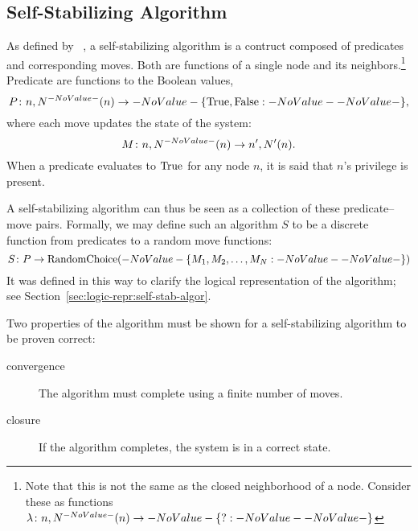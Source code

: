 \subsection{Self-Stabilizing Algorithm}
\label{sec:math-define:self-stab-algor}

As defined by \citeauthor{Dijkstra:1974:SSS:361179.361202}~\autocite{Dijkstra:1974:SSS:361179.361202},
  \done
  a self-stabilizing algorithm is a contruct composed of
  predicates and corresponding moves.
Both are functions of a single node and its neighbors.\footnote{%
  Note that this is not the same as the closed neighborhood of a node.
  Consider these as functions $\Function{n, \OpenNeighborhood{n}}{\Set ?}$}
Predicate are functions to the Boolean values,
  \begin{equation}
  \label{eq:define-predicate}
  \Function[P]{n, \OpenNeighborhood{n}}{\SetBoolean},
  \end{equation}
  where each move updates the state of the system:
  \begin{equation}
  \label{eq:define-move}
  \Function[M]{n, \OpenNeighborhood{n}}{n^\prime, \OpenNeighborhood[\prime]{n}}.
  \end{equation}
When a predicate evaluates to $\text{True}$ for any node $n$,
  it is said that $n$'s privilege is present.

A self-stabilizing algorithm can thus be seen as
  a collection of these predicate--move pairs.
Formally, we may define such an algorithm $S$ to be a discrete function
  from predicates to a random move functions:
  \begin{equation}
    \label{eq:define-ssalg}
    \Function[S]{P}{\operatorname{RandomChoice}(\Set{M_1, M_2, \dots, M_N})}
  \end{equation}
It was defined in this way to clarify the logical representation of the algorithm;
  see Section~\ref{sec:logic-repr:self-stab-algor}.

Two properties of the algorithm must be shown
  for a self-stabilizing algorithm to be proven correct:~\autocite{arora:closure-and-convergence}
\begin{description}
\item[convergence] The algorithm must complete using a finite number of moves.
\item[closure] If the algorithm completes, the system is in a correct state.
  \done{}
\end{description}

